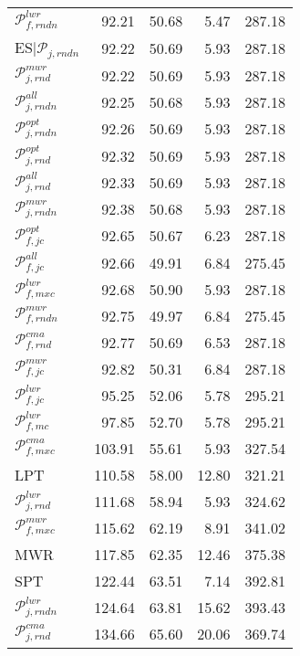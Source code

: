 \begin{tabular}{|@{}l@{}|@{}r@{}|@{}r@{}|@{}r@{}|@{}r@{}|}
${\mathcal{P}_{f,rndn}^{lwr}}$ &  92.21 &  50.68 &  5.47 &  287.18  \\ 
ES$|{\mathcal{P}_{j,rndn}}$ &  92.22 &  50.69 &  5.93 &  287.18  \\ 
${\mathcal{P}_{j,rnd}^{mwr}}$ &  92.22 &  50.69 &  5.93 &  287.18  \\ 
${\mathcal{P}_{j,rndn}^{all}}$ &  92.25 &  50.68 &  5.93 &  287.18  \\ 
${\mathcal{P}_{j,rndn}^{opt}}$ &  92.26 &  50.69 &  5.93 &  287.18  \\ 
${\mathcal{P}_{j,rnd}^{opt}}$ &  92.32 &  50.69 &  5.93 &  287.18  \\ 
${\mathcal{P}_{j,rnd}^{all}}$ &  92.33 &  50.69 &  5.93 &  287.18  \\ 
${\mathcal{P}_{j,rndn}^{mwr}}$ &  92.38 &  50.68 &  5.93 &  287.18  \\ 
${\mathcal{P}_{f,jc}^{opt}}$ &  92.65 &  50.67 &  6.23 &  287.18  \\ 
${\mathcal{P}_{f,jc}^{all}}$ &  92.66 &  49.91 &  6.84 &  275.45  \\ 
${\mathcal{P}_{f,mxc}^{lwr}}$ &  92.68 &  50.90 &  5.93 &  287.18  \\ 
${\mathcal{P}_{f,rndn}^{mwr}}$ &  92.75 &  49.97 &  6.84 &  275.45  \\ 
${\mathcal{P}_{f,rnd}^{cma}}$ &  92.77 &  50.69 &  6.53 &  287.18  \\ 
${\mathcal{P}_{f,jc}^{mwr}}$ &  92.82 &  50.31 &  6.84 &  287.18  \\ 
${\mathcal{P}_{f,jc}^{lwr}}$ &  95.25 &  52.06 &  5.78 &  295.21  \\ 
\boldmath${\mathcal{P}_{f,mc}^{lwr}}$ &  97.85 &  52.70 &  5.78 &  295.21  \\ 
${\mathcal{P}_{f,mxc}^{cma}}$ &  103.91 &  55.61 &  5.93 &  327.54  \\ 
LPT &  110.58 &  58.00 &  12.80 &  321.21  \\ 
${\mathcal{P}_{j,rnd}^{lwr}}$ &  111.68 &  58.94 &  5.93 &  324.62  \\ 
${\mathcal{P}_{f,mxc}^{mwr}}$ &  115.62 &  62.19 &  8.91 &  341.02  \\ 
MWR &  117.85 &  62.35 &  12.46 &  375.38  \\ 
SPT &  122.44 &  63.51 &  7.14 &  392.81  \\ 
${\mathcal{P}_{j,rndn}^{lwr}}$ &  124.64 &  63.81 &  15.62 &  393.43  \\ 
${\mathcal{P}_{j,rnd}^{cma}}$ &  134.66 &  65.60 &  20.06 &  369.74  \\ \hline
\end{tabular}
